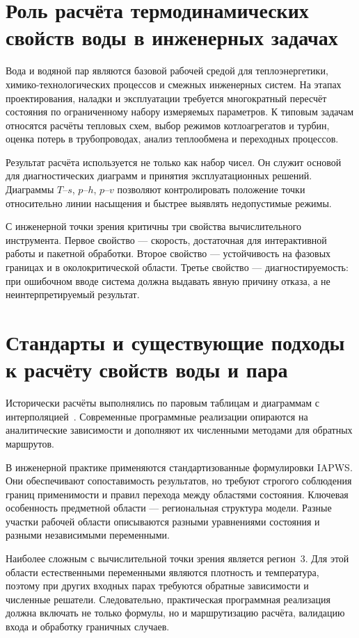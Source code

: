 \section{Роль расчёта термодинамических свойств воды в инженерных задачах}

Вода и водяной пар являются базовой рабочей средой для теплоэнергетики,
химико-технологических процессов и смежных инженерных систем.
На этапах проектирования, наладки и эксплуатации требуется многократный пересчёт
состояния по ограниченному набору измеряемых параметров.
К типовым задачам относятся расчёты тепловых схем, выбор режимов котлоагрегатов и турбин,
оценка потерь в трубопроводах, анализ теплообмена и переходных процессов.

Результат расчёта используется не только как набор чисел.
Он служит основой для диагностических диаграмм и принятия эксплуатационных решений.
Диаграммы $T$--$s$, $p$--$h$, $p$--$v$ позволяют контролировать положение точки
относительно линии насыщения и быстрее выявлять недопустимые режимы.

С инженерной точки зрения критичны три свойства вычислительного инструмента.
Первое свойство --- скорость, достаточная для интерактивной работы и пакетной обработки.
Второе свойство --- устойчивость на фазовых границах и в околокритической области.
Третье свойство --- диагностируемость: при ошибочном вводе система должна выдавать
явную причину отказа, а не неинтерпретируемый результат.

\section{Стандарты и существующие подходы к расчёту свойств воды и пара}

Исторически расчёты выполнялись по паровым таблицам и диаграммам с интерполяцией~\cite{alexandrov_grigorev_1999}.
Современные программные реализации опираются на аналитические зависимости
и дополняют их численными методами для обратных маршрутов.

В инженерной практике применяются стандартизованные формулировки IAPWS.
Они обеспечивают сопоставимость результатов, но требуют строгого соблюдения
границ применимости и правил перехода между областями состояния.
Ключевая особенность предметной области --- региональная структура модели.
Разные участки рабочей области описываются разными уравнениями состояния
и разными независимыми переменными.

Наиболее сложным с вычислительной точки зрения является регион~3.
Для этой области естественными переменными являются плотность и температура,
поэтому при других входных парах требуются обратные зависимости и численные решатели.
Следовательно, практическая программная реализация должна включать не только формулы,
но и маршрутизацию расчёта, валидацию входа и обработку граничных случаев.

